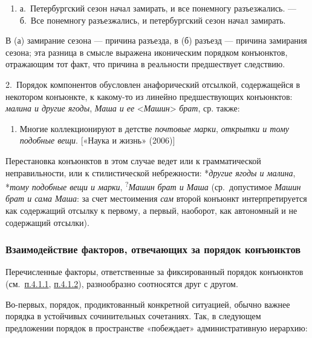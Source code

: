 \begin{enumerate}
\def\labelenumi{(\arabic{enumi})}
\setcounter{enumi}{25}
\item
  а.~Петербургский сезон начал замирать, и все понемногу разъезжались.
  --- б.~Все понемногу разъезжались, и петербургский сезон начал
  замирать.
\end{enumerate}

В (а) замирание сезона --- причина разъезда, в (б) разъезд --- причина
замирания сезона; эта разница в смысле выражена иконическим порядком
конъюнктов, отражающим тот факт, что причина в реальности предшествует
следствию.

2.~Порядок компонентов обусловлен анафорический отсылкой, содержащейся в
некотором конъюнкте, к какому-то из линейно предшествующих конъюнктов:
\textit{малина и другие ягоды}, \textit{Маша и ее}
\textless{}\textit{Машин}\textgreater{} \textit{брат}, ср. также:

\begin{enumerate}
\def\labelenumi{(\arabic{enumi})}
\setcounter{enumi}{26}
\item
  Многие коллекционируют в детстве \textit{почтовые марки}, \textit{открытки
  и тому подобные вещи}. {[}«Наука и жизнь» (2006){]}
\end{enumerate}

Перестановка конъюнктов в этом случае ведет или к грамматической
неправильности, или к стилистической небрежности: *\textit{другие ягоды и
малина}, *\textit{тому подобные вещи и марки},
\textsuperscript{?}\textit{Машин брат и Маша} (ср.~допустимое \textit{Машин
брат и сама Маша}: за счет местоимения \textit{сам} второй конъюнкт
интерпретируется как содержащий отсылку к первому, а первый, наоборот,
как автономный и не содержащий отсылки).

\subsubsection{Взаимодействие факторов, отвечающих за порядок
конъюнктов}\label{ux432ux437ux430ux438ux43cux43eux434ux435ux439ux441ux442ux432ux438ux435-ux444ux430ux43aux442ux43eux440ux43eux432-ux43eux442ux432ux435ux447ux430ux44eux449ux438ux445-ux437ux430-ux43fux43eux440ux44fux434ux43eux43a-ux43aux43eux43dux44aux44eux43dux43aux442ux43eux432}

Перечисленные факторы, ответственные за фиксированный порядок конъюнктов
(см.~\underline{п.4.1.1}, \underline{п.4.1.2}), разнообразно соотносятся
друг с другом.

Во-первых, порядок, продиктованный конкретной ситуацией, обычно важнее
порядка в устойчивых сочинительных сочетаниях. Так, в следующем
предложении порядок в пространстве «побеждает» административную
иерархию:

